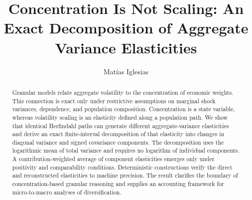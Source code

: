 \documentclass[a4paper,fleqn]{cas-dc}
\begin{document}
\let\WriteBookmarks\relax
\def\floatpagepagefraction{1}
\def\textpagefraction{0.001}




\title[mode=title]{
Concentration Is Not Scaling:
An Exact Decomposition of Aggregate Variance Elasticities
}


\author[1]{Matías Iglesias}
\cormark[1]







\begin{abstract}
Granular models relate aggregate volatility to the concentration of
economic weights. This connection is exact only under restrictive
assumptions on marginal shock variances, dependence, and population
composition. Concentration is a state variable, whereas volatility
scaling is an elasticity defined along a population path. We show that
identical Herfindahl paths can generate different aggregate-variance
elasticities and derive an exact finite-interval decomposition of that
elasticity into changes in diagonal variance and signed covariance
components. The decomposition uses the logarithmic mean of total
variance and requires no logarithm of individual components. A
contribution-weighted average of component elasticities emerges only
under positivity and comparability conditions. Deterministic
constructions verify the direct and reconstructed elasticities to
machine precision. The result clarifies the boundary of
concentration-based granular reasoning and supplies an accounting
framework for micro-to-macro analyses of diversification.
\end{abstract}
\end{document}
